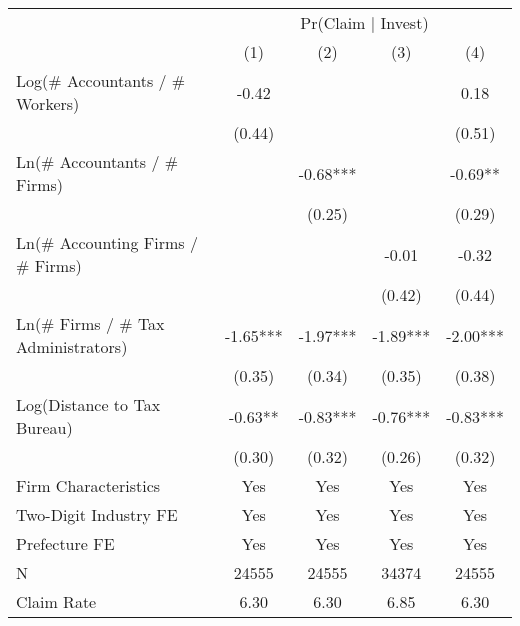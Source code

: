 \begin{tabular}{lcccc}
\toprule
                    &\multicolumn{4}{c}{Pr(Claim $\mid$ Invest)}                    \\\cmidrule(lr){2-5}
                    &         (1)   &         (2)   &         (3)   &         (4)   \\
\midrule
Log(\# Accountants / \# Workers)&       -0.42   &               &               &        0.18   \\
                    &      (0.44)   &               &               &      (0.51)   \\
\addlinespace
Ln(\# Accountants / \# Firms)&               &       -0.68***&               &       -0.69** \\
                    &               &      (0.25)   &               &      (0.29)   \\
\addlinespace
Ln(\# Accounting Firms / \# Firms)&               &               &       -0.01   &       -0.32   \\
                    &               &               &      (0.42)   &      (0.44)   \\
\addlinespace
Ln(\# Firms / \# Tax Administrators)&       -1.65***&       -1.97***&       -1.89***&       -2.00***\\
                    &      (0.35)   &      (0.34)   &      (0.35)   &      (0.38)   \\
\addlinespace
Log(Distance to Tax Bureau)&       -0.63** &       -0.83***&       -0.76***&       -0.83***\\
                    &      (0.30)   &      (0.32)   &      (0.26)   &      (0.32)   \\
\addlinespace
\midrule
Firm Characteristics&         Yes   &         Yes   &         Yes   &         Yes   \\
Two-Digit Industry FE&         Yes   &         Yes   &         Yes   &         Yes   \\
Prefecture FE       &         Yes   &         Yes   &         Yes   &         Yes   \\
N                   &       24555   &       24555   &       34374   &       24555   \\
Claim Rate          &        6.30   &        6.30   &        6.85   &        6.30   \\
\bottomrule
\end{tabular}
